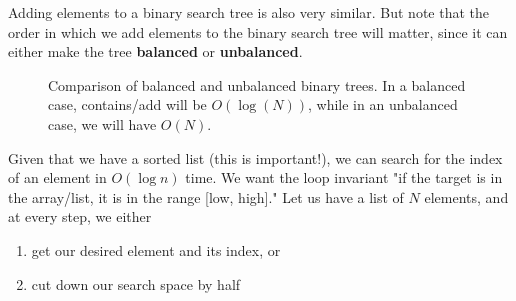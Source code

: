   Adding elements to a binary search tree is also very similar. But note that the order in which we add elements to the binary search tree will matter, since it can either make the tree \textbf{balanced} or \textbf{unbalanced}. 

  \begin{figure}[H]
    \centering 
    \caption{Comparison of balanced and unbalanced binary trees. In a balanced case, contains/add will be $O(\log(N))$, while in an unbalanced case, we will have $O(N)$.}
    \label{fig:trees}
  \end{figure}

  \begin{definition}
    Given that we have a sorted list (this is important!), we can search for the index of an element in $O(\log{n})$ time. We want the loop invariant "if the target is in the array/list, it is in the range [low, high]." Let us have a list of $N$ elements, and at every step, we either 
    \begin{enumerate}
      \item get our desired element and its index, or 
      \item cut down our search space by half
    \end{enumerate}
  \end{definition}

